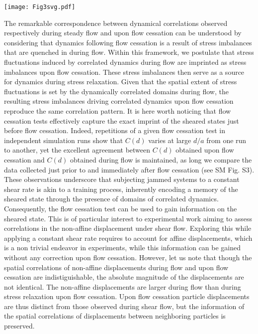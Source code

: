 \documentclass[%
preprint,
 amsmath,amssymb,
 aps,
]{revtex4-1}
\begin{document}
\begin{figure*}[h!]
\texttt{[image: Fig3svg.pdf]}
\caption{\label{corel} {\bf Memory of spatial correlations of particle displacements.} {\bf(a)} Selected examples of the spatial correlation function of dynamical fluctuations $C$ obtained for $\zeta = 1$ $\uptau_o \epsilon/a^2$. The closed symbols denote data obtained just before flow cessation and the open symbols denote the data obtained just after flow cessation.  From top to bottom $\dot{\gamma} = 10^{-4}, 5 \times 10^{-4}, 10^{-3}, 10^{-2}, 10^{-1}, 10^{0}$ $\uptau_o^{-1}$. {\bf(b)} Shear rate dependence of the correlation length determined from the decay rate of $C$. The dashed line is a power-law fit to the data with exponent $-0.2$.}
\end{figure*}

The remarkable correspondence between dynamical correlations observed respectively during steady flow and upon flow cessation can be understood by considering that dynamics following flow cessation is a result of stress imbalances that are quenched in during flow. Within this framework, we postulate that stress fluctuations induced by correlated dynamics during flow are imprinted as stress imbalances upon flow cessation. These stress imbalances then serve as a source for dynamics during stress relaxation. Given that the spatial extent of stress fluctuations is set by the dynamically correlated domains during flow, the resulting stress imbalances driving correlated dynamics upon flow cessation reproduce the same correlation pattern. It is here worth noticing that 
flow cessation tests effectively capture the exact imprint of the sheared states just before flow cessation. Indeed, repetitions of a given flow cessation test in independent simulation runs show that $C(d)$ varies at large $d/a$ from one run to another, yet the excellent agreement between $C(d)$ obtained upon flow cessation and $C(d)$ obtained during flow is maintained, as long we compare the data collected just prior to and immediately after flow cessation (see SM Fig. S3). 
These observations underscore that subjecting jammed systems to a constant shear rate is akin to a training process, inherently encoding a memory of the sheared state through the presence of domains of correlated dynamics. Consequently, the flow cessation test can be used to gain information on the sheared state. This is of particular interest to experimental work aiming to assess correlations in the non-affine displacement under shear flow. Exploring this while applying a constant shear rate requires to account for affine displacements, which is a non trivial endeavor in experiments, while this information can be gained without any correction upon flow cessation.   
However, let us note that though the spatial correlations of non-affine displacements during flow and upon flow cessation are indistiguishable, the absolute magnitude of the displacements are not identical. The non-affine displacements are larger during flow than during stress relaxation upon flow cessation. Upon flow cessation particle displacements are thus distinct from those observed during shear flow, but the information of the spatial correlations of displacements between neighboring particles is preserved.  
\end{document}
